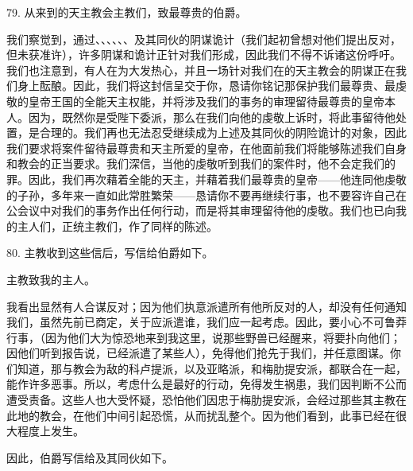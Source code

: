 \par

79. 从来到的天主教会主教们，致最尊贵的伯爵。\par

我们察觉到，通过、、、、、、及其同伙的阴谋诡计（我们起初曾想对他们提出反对，但未获准许），许多阴谋和诡计正针对我们形成，因此我们不得不诉诸这份呼吁。我们也注意到，有人在为大发热心，并且一场针对我们在的天主教会的阴谋正在我们身上酝酿。因此，我们将这封信呈交于你，恳请你铭记那保护我们最尊贵、最虔敬的皇帝王国的全能天主权能，并将涉及我们的事务的审理留待最尊贵的皇帝本人。因为，既然你是受陛下委派，那么在我们向他的虔敬上诉时，将此事留待他处置，是合理的。我们再也无法忍受继续成为上述及其同伙的阴险诡计的对象，因此我们要求将案件留待最尊贵和天主所爱的皇帝，在他面前我们将能够陈述我们自身和教会的正当要求。我们深信，当他的虔敬听到我们的案件时，他不会定我们的罪。因此，我们再次藉着全能的天主，并藉着我们最尊贵的皇帝——他连同他虔敬的子孙，多年来一直如此常胜繁荣——恳请你不要再继续行事，也不要容许自己在公会议中对我们的事务作出任何行动，而是将其审理留待他的虔敬。我们也已向我的主人们，正统主教们，作了同样的陈述。\par

80. 主教收到这些信后，写信给伯爵如下。\par

主教致我的主人。\par

我看出显然有人合谋反对；因为他们执意派遣所有他所反对的人，却没有任何通知我们，虽然先前已商定，关于应派遣谁，我们应一起考虑。因此，要小心不可鲁莽行事，（因为他们大为惊恐地来到我这里，说那些野兽已经醒来，将要扑向他们；因他们听到报告说，已经派遣了某些人），免得他们抢先于我们，并任意图谋。你们知道，那与教会为敌的科卢提派，以及亚略派，和梅肋提安派，都联合在一起，能作许多恶事。所以，考虑什么是最好的行动，免得发生祸患，我们因判断不公而遭受责备。这些人也大受怀疑，恐怕他们因忠于梅肋提安派，会经过那些其主教在此地的教会，在他们中间引起恐慌，从而扰乱整个。因为他们看到，此事已经在很大程度上发生。\par

因此，伯爵写信给及其同伙如下。\par

